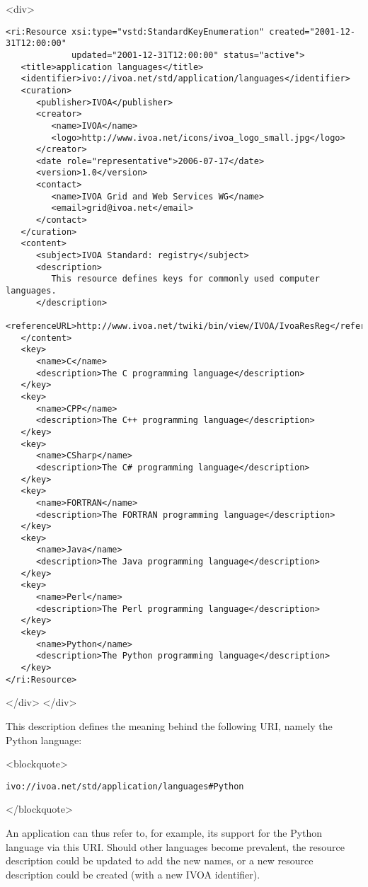 \documentclass[11pt,a4paper]{ivoa}
\begin{document}
{{<div>
\begin{verbatim}
<ri:Resource xsi:type="vstd:StandardKeyEnumeration" created="2001-12-31T12:00:00"
             updated="2001-12-31T12:00:00" status="active">
   <title>application languages</title>
   <identifier>ivo://ivoa.net/std/application/languages</identifier>
   <curation>
      <publisher>IVOA</publisher>
      <creator>
         <name>IVOA</name>
         <logo>http://www.ivoa.net/icons/ivoa_logo_small.jpg</logo>
      </creator>
      <date role="representative">2006-07-17</date>
      <version>1.0</version>
      <contact>
         <name>IVOA Grid and Web Services WG</name>
         <email>grid@ivoa.net</email>
      </contact>
   </curation>
   <content>
      <subject>IVOA Standard: registry</subject>
      <description>
         This resource defines keys for commonly used computer languages.
      </description>
      <referenceURL>http://www.ivoa.net/twiki/bin/view/IVOA/IvoaResReg</referenceURL>
   </content>
   <key>
      <name>C</name>
      <description>The C programming language</description>
   </key>
   <key>
      <name>CPP</name>
      <description>The C++ programming language</description>
   </key>
   <key>
      <name>CSharp</name>
      <description>The C# programming language</description>
   </key>
   <key>
      <name>FORTRAN</name>
      <description>The FORTRAN programming language</description>
   </key>
   <key>
      <name>Java</name>
      <description>The Java programming language</description>
   </key>
   <key>
      <name>Perl</name>
      <description>The Perl programming language</description>
   </key>
   <key>
      <name>Python</name>
      <description>The Python programming language</description>
   </key>
</ri:Resource>
\end{verbatim}

</div>
</div>

This description defines the meaning behind the following URI, namely
the Python language:



<blockquote>
\begin{verbatim}
ivo://ivoa.net/std/application/languages#Python
\end{verbatim}

</blockquote>

An application can thus refer to, for example, its support for the
Python language via this URI.  Should other languages become
prevalent, the resource description could be updated to add the new
names, or a new resource description could be created (with a new IVOA
identifier). 



}}
\end{document}
